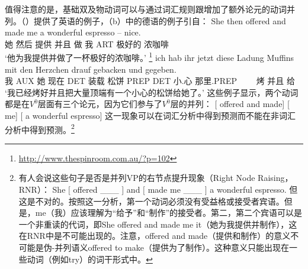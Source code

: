 \noindent
    值得注意的是，基础双及物动词可以与通过词汇规则跟增加了额外论元的动词并列。（）提供了英语的例子，（b）中的德语的例子引自：
\eal
\label{promise-make}
\ex 
\gll She then offered and made me a wonderful espresso -- nice.\\
     她  然后 提供 并且 做 我 ART 极好的 浓咖啡\\
\glt `他为我提供并做了一杯极好的浓咖啡。'  
\footnote{
\url{http://www.thespinroom.com.au/?p=102} 
}
\ex 
\label{ex-gebacken-und-gegeben}
\gll ich hab ihr jetzt diese Ladung Muffins mit den Herzchen drauf gebacken und gegeben.\footnotemark\\
     我 AUX 她 现在 DET 装载 松饼 PREP DET 小.心 那里.PREP~~~~ 烤 并且 给\\
\glt `我已经烤好并且把大量顶端有一个小心的松饼给她了。'
\zl
\noindent
这些例子显示，两个动词都是在$V^0$层面有三个论元，因为它们参与了$V^0$层的并列：
\ea
{}[\sub{\vnull} offered and made] [ me]    [ a wonderful espresso] 
\z
这一现象可以在词汇分析中得到预测而不能在非词汇分析中得到预测。\footnote{
有人会说这些句子是否是并列VP的右节点提升现象（Right Node Raising，RNR）\citep{Bresnan74a-u, Abbott76a-u}： 
\ea \label{rnr}
She $[$ offered  \_\_\_  $]$ and $[$ made me \_\_\_ $]$  a wonderful espresso. 
\z
但这是不对的。按照这一分析，第一个动词必须没有受益格或接受者宾语。但是，me（我）应该理解为“给予”和“制作”的接受者。第二，第二个宾语可以是一个非重读的代词，即She offered and made me it（她为我提供并制作），这在RNR中是不可能出现的。注意，offered and made（提供和制作）的意义不可能是伪-并列语义offered to make（提供为了制作）。这种意义只能出现在一些动词（例如try）的词干形式中。
}  


